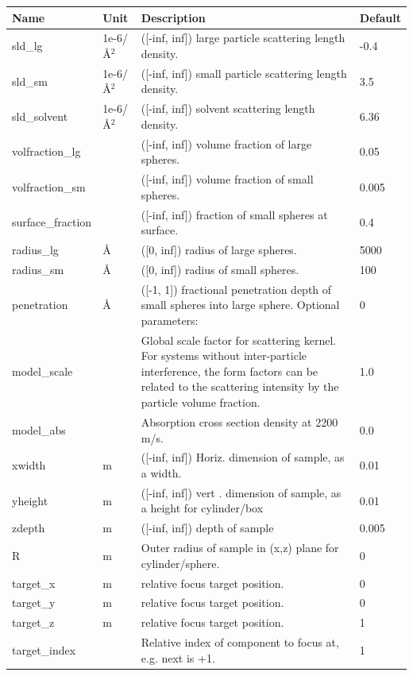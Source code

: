 \begin{longtable}{p{}p{}p{}p{}}
\toprule
\textbf{Name} & \textbf{Unit} & \textbf{Description} & \textbf{Default} \\
\midrule
\endhead
sld\_lg & 1e-6/\AA{}$^{2}$ & ([-inf, inf]) large particle scattering length density. & -0.4 \\
sld\_sm & 1e-6/\AA{}$^{2}$ & ([-inf, inf]) small particle scattering length density. & 3.5 \\
sld\_solvent & 1e-6/\AA{}$^{2}$ & ([-inf, inf]) solvent scattering length density. & 6.36 \\
volfraction\_lg &  & ([-inf, inf]) volume fraction of large spheres. & 0.05 \\
volfraction\_sm &  & ([-inf, inf]) volume fraction of small spheres. & 0.005 \\
surface\_fraction &  & ([-inf, inf]) fraction of small spheres at surface. & 0.4 \\
radius\_lg & \AA{} & ([0, inf]) radius of large spheres. & 5000 \\
radius\_sm & \AA{} & ([0, inf]) radius of small spheres. & 100 \\
penetration & \AA{} & ([-1, 1]) fractional penetration depth of small spheres into large sphere. Optional parameters: & 0 \\
model\_scale &   & Global scale factor for scattering kernel. For systems without inter-particle interference, the form factors can be related to the scattering intensity by the particle volume fraction. & 1.0 \\
model\_abs &   & Absorption cross section density at 2200 m/s. & 0.0 \\
xwidth & m & ([-inf, inf]) Horiz. dimension of sample, as a width. & 0.01 \\
yheight & m & ([-inf, inf]) vert . dimension of sample, as a height for cylinder/box & 0.01 \\
zdepth & m & ([-inf, inf]) depth of sample & 0.005 \\
R & m & Outer radius of sample in (x,z) plane for cylinder/sphere. & 0 \\
target\_x & m & relative focus target position. & 0 \\
target\_y & m & relative focus target position. & 0 \\
target\_z & m & relative focus target position. & 1 \\
target\_index &   & Relative index of component to focus at, e.g. next is +1. & 1 \\

\end{longtable}
